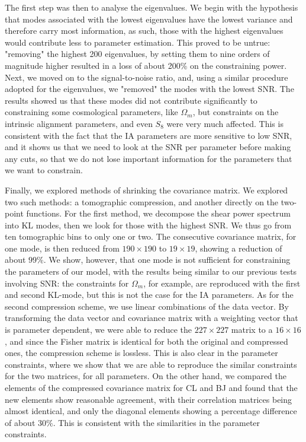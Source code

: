 \documentclass[twocolumn]{\docclass}
\begin{document}
	The first step was then to analyse the eigenvalues. We begin with the hypothesis that modes associated with the lowest eigenvalues have the lowest variance and therefore carry most information, as such, those with the highest eigenvalues would contribute less to parameter estimation. This proved to be untrue: "removing" the highest 200 eigenvalues, by setting them to nine orders of magnitude higher resulted in a loss of about 200\% on the constraining power. Next, we moved on to the signal-to-noise ratio, and, using a similar procedure adopted for the eigenvalues, we "removed" the modes with the lowest SNR. The results showed us that these modes did not contribute significantly to constraining some cosmological parameters, like $\Omega_m$, but constraints on the intrinsic alignment parameters, and even $S_8$ were very much affected. This is consistent with the fact that the IA parameters are more sensitive to low SNR, and it shows us that we need to look at the SNR per parameter before making any cuts, so that we do not lose important information for the parameters that we want to constrain.
	
	Finally, we explored methods of shrinking the covariance matrix. We explored two such methods: a tomographic compression, and another directly on the two-point functions. For the first method, we decompose the shear power spectrum into KL modes, then we look for those with the highest SNR. We thus go from ten tomographic bins to only one or two. The consecutive covariance matrix, for one mode, is then reduced from $190 \times 190$ to $19 \times 19$, showing a reduction of about $99\%$. We show, however, that one mode is not sufficient for constraining the parameters of our model, with the results being similar to our previous tests involving SNR: the constraints for $\Omega_m$, for example, are reproduced with the first and second KL-mode, but this is not the case for the IA parameters. As for the second compression scheme, we use linear combinations of the data vector. By transforming the data vector and covariance matrix with a weighting vector that is parameter dependent, we were able to reduce the $227 \times 227$ matrix to a $16 \times 16$, and since the Fisher matrix is identical for both the original and compressed ones, the compression scheme is lossless. This is also clear in the parameter constraints, where we show that we are able to reproduce the similar constraints for the two matrices, for all parameters. On the other hand, we compared the elements of the compressed covariance matrix for CL and BJ and found that the new elements show reasonable agreement, with their correlation matrices being almost identical, and only the diagonal elements showing a percentage difference of about $30\%$. This is consistent with the similarities in the parameter constraints.
	
\end{document}
